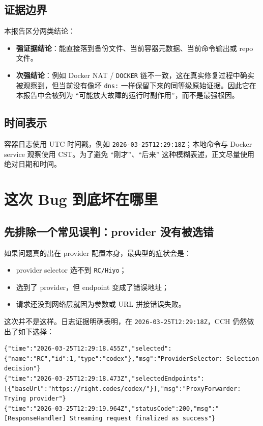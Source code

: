 \documentclass[a4paper]{article}
\begin{document}
\subsection{证据边界}

本报告区分两类结论：

\begin{itemize}
\item \textbf{强证据结论}：能直接落到备份文件、当前容器元数据、当前命令输出或 repo 文件。
\item \textbf{次强结论}：例如 Docker NAT / \texttt{DOCKER} 链不一致，这在真实修复过程中确实被观察到，但当前没有像坏 \texttt{dns:} 一样保留下来的同等级原始证据。因此它在本报告中会被列为 ``可能放大故障的运行时副作用''，而不是最强根因。
\end{itemize}

\subsection{时间表示}

容器日志使用 UTC 时间戳，例如 \texttt{2026-03-25T12:29:18Z}；本地命令与 Docker service 观察使用 CST。为了避免 ``刚才''、``后来'' 这种模糊表述，正文尽量使用绝对日期和时间。

\section{这次 Bug 到底坏在哪里}

\subsection{先排除一个常见误判：provider 没有被选错}

如果问题真的出在 provider 配置本身，最典型的症状会是：

\begin{itemize}
\item provider selector 选不到 \texttt{RC/Hiyo}；
\item 选到了 provider，但 endpoint 变成了错误地址；
\item 请求还没到网络层就因为参数或 URL 拼接错误失败。
\end{itemize}

这次并不是这样。日志证据明确表明，在 \texttt{2026-03-25T12:29:18Z}，CCH 仍然做出了如下选择：

\begin{lstlisting}[caption={应用日志显示 provider 选择仍然是 RC，并尝试命中 right.codes}]
{"time":"2026-03-25T12:29:18.455Z","selected":{"name":"RC","id":1,"type":"codex"},"msg":"ProviderSelector: Selection decision"}
{"time":"2026-03-25T12:29:18.473Z","selectedEndpoints":[{"baseUrl":"https://right.codes/codex/"}],"msg":"ProxyForwarder: Trying provider"}
{"time":"2026-03-25T12:29:19.964Z","statusCode":200,"msg":"[ResponseHandler] Streaming request finalized as success"}
\end{lstlisting}
\end{document}
